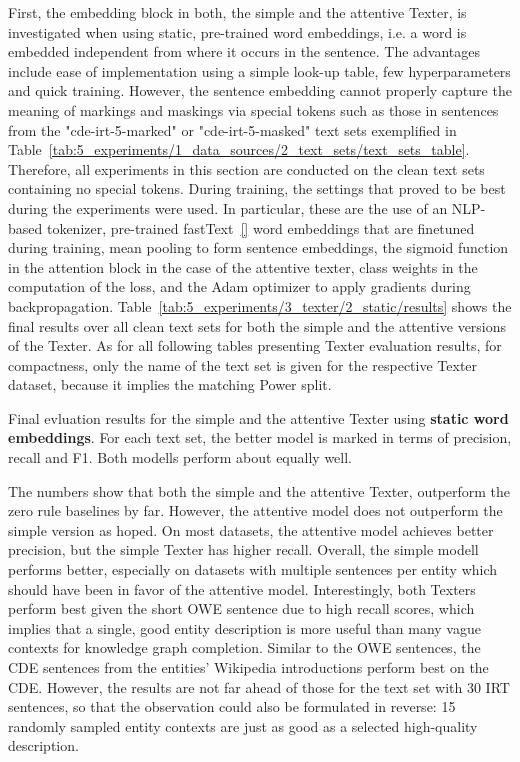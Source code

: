 First, the embedding block in both, the simple and the attentive Texter, is investigated when using static, pre-trained word embeddings, i.e. a word is embedded independent from where it occurs in the sentence. The advantages include ease of implementation using a simple look-up table, few hyperparameters and quick training. However, the sentence embedding cannot properly capture the meaning of markings and maskings via special tokens such as those in sentences from the "cde-irt-5-marked" or "cde-irt-5-masked" text sets exemplified in Table~\ref{tab:5_experiments/1_data_sources/2_text_sets/text_sets_table}. Therefore, all experiments in this section are conducted on the clean text sets containing no special tokens. During training, the settings that proved to be best during the experiments were used. In particular, these are the use of an NLP-based tokenizer, pre-trained fastText~\ref{} word embeddings that are finetuned during training, mean pooling to form sentence embeddings, the sigmoid function in the attention block in the case of the attentive texter, class weights in the computation of the loss, and the Adam optimizer to apply gradients during backpropagation. Table~\ref{tab:5_experiments/3_texter/2_static/results} shows the final results over all clean text sets for both the simple and the attentive versions of the Texter. As for all following tables presenting Texter evaluation results, for compactness, only the name of the text set is given for the respective Texter dataset, because it implies the matching Power split.

\begin{table}[t]
    \centering
    
    \caption{Final evluation results for the simple and the attentive Texter using \textbf{static word embeddings}. For each text set, the better model is marked in terms of precision, recall and F1. Both modells perform about equally well.}
    \label{tab:5_experiments/3_texter/2_static/results}
\end{table}

The numbers show that both the simple and the attentive Texter, outperform the zero rule baselines by far. However, the attentive model does not outperform the simple version as hoped. On most datasets, the attentive model achieves better precision, but the simple Texter has higher recall. Overall, the simple modell performs better, especially on datasets with multiple sentences per entity which should have been in favor of the attentive model. Interestingly, both Texters perform best given the short OWE sentence due to high recall scores, which implies that a single, good entity description is more useful than many vague contexts for knowledge graph completion. Similar to the OWE sentences, the CDE sentences from the entities' Wikipedia introductions perform best on the CDE. However, the results are not far ahead of those for the text set with 30 IRT sentences, so that the observation could also be formulated in reverse: 15 randomly sampled entity contexts are just as good as a selected high-quality description.

